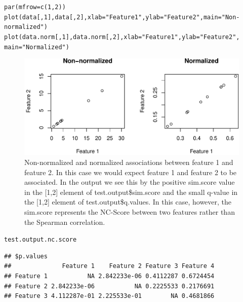 \documentclass{article}\usepackage[]{graphicx}\usepackage[usenames,dvipsnames]{color}
\makeatletter
\def\maxwidth{ %
  \ifdim\Gin@nat@width>\linewidth
    \linewidth
  \else
    \Gin@nat@width
  \fi
}
\newcommand{\hlnum}[1]{\textcolor[rgb]{0.816,0.125,0.439}{#1}}%
\newcommand{\hlstr}[1]{\textcolor[rgb]{0.251,0.627,0.251}{#1}}%
\newcommand{\hlstd}[1]{\textcolor[rgb]{0.251,0.251,0.251}{#1}}%
\newcommand{\hlkwc}[1]{\textcolor[rgb]{0.251,0.251,0.251}{#1}}%
\newcommand{\hlkwd}[1]{\textcolor[rgb]{0.878,0.439,0.125}{#1}}%
\newenvironment{knitrout}{}{} %
\makeatother
\begin{document}
\begin{knitrout}
\color{fgcolor}\begin{kframe}
\begin{alltt}
\hlkwd{par}\hlstd{(}\hlkwc{mfrow}\hlstd{=}\hlkwd{c}\hlstd{(}\hlnum{1}\hlstd{,}\hlnum{2}\hlstd{))}
\hlkwd{plot}\hlstd{(data[,}\hlnum{1}\hlstd{],data[,}\hlnum{2}\hlstd{],}\hlkwc{xlab}\hlstd{=}\hlstr{"Feature 1"}\hlstd{,}\hlkwc{ylab}\hlstd{=}\hlstr{"Feature 2"}\hlstd{,}\hlkwc{main}\hlstd{=}\hlstr{"Non-normalized"}\hlstd{)}
\hlkwd{plot}\hlstd{(data.norm[,}\hlnum{1}\hlstd{],data.norm[,}\hlnum{2}\hlstd{],}\hlkwc{xlab}\hlstd{=}\hlstr{"Feature 1"}\hlstd{,}\hlkwc{ylab}\hlstd{=}\hlstr{"Feature 2"}\hlstd{,}
     \hlkwc{main}\hlstd{=}\hlstr{"Normalized"}\hlstd{)}
\end{alltt}
\end{kframe}\begin{figure}[H]
\includegraphics[width=\maxwidth]{figure/unnamed-chunk-9-1} \caption{Non-normalized and normalized associations between feature 1 and feature 2.  In this case we would expect feature 1 and feature 2 to be associated. In the output we see this by the positive sim.score value in the [1,2] element of test.output\$sim.score and the small q-value in the [1,2] element of test.output\$q.values. In this case, however, the sim.score represents the NC-Score between two features rather than the Spearman correlation.}\label{fig:unnamed-chunk-9}
\end{figure}
\begin{kframe}\begin{alltt}
\hlstd{test.output.nc.score}
\end{alltt}
\begin{verbatim}
## $p.values
##              Feature 1    Feature 2 Feature 3 Feature 4
## Feature 1           NA 2.842233e-06 0.4112287 0.6724454
## Feature 2 2.842233e-06           NA 0.2225533 0.2176691
## Feature 3 4.112287e-01 2.225533e-01        NA 0.4681866

\end{verbatim}
\end{kframe}
\end{knitrout}
\end{document}
